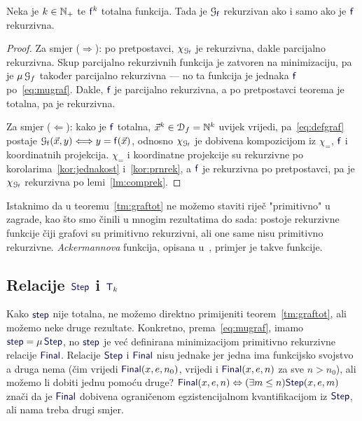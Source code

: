 \begin{teorem}\label{tm:graftot}
Neka je $k\in{\mathbb N}_+$ te $\f{f}^k$ totalna funkcija. Tada je $\graf{\f f}$ rekurzivan ako i samo ako je $\f f$ rekurzivna.
\end{teorem}
\begin{proof}
Za smjer ($\Rightarrow$): po pretpostavci, $\chi_{\graf{\f f}}$ je rekurzivna, dakle parcijalno rekurzivna. Skup parcijalno rekurzivnih funkcija je zatvoren na minimizaciju, pa je $\mu\,\mathcal G_{f}$ također parcijalno rekurzivna --- no ta funkcija je jednaka $\f f$ po~\eqref{eq:mugraf}. Dakle, $\f f$ je parcijalno rekurzivna, a po pretpostavci teorema je totalna, pa je rekurzivna.

Za smjer ($\Leftarrow$): kako je $\f f$ totalna, $\vec x^k\in\mathcal D_{f}={\mathbb N}^k$ uvijek vrijedi, pa~\eqref{eq:defgraf} postaje $\graf{\f f}(\vec x,y)\Longleftrightarrow y=\f f(\vec x)$, odnosno $\chi_{\graf{\f f}}$ je dobivena kompozicijom iz $\chi_=$, $\f f$ i koordinatnih projekcija. $\chi_=$ i koordinatne projekcije su rekurzivne po korolarima~\ref{kor:jednakost} i~\ref{kor:prnrek}, a $\f f$ je rekurzivna po pretpostavci, pa je $\chi_{\graf{\f f}}$ rekurzivna po lemi~\ref{lm:comprek}.
\end{proof}

Istaknimo da u teoremu~\ref{tm:graftot} ne možemo staviti riječ "primitivno" u zagrade, kao što smo činili u mnogim rezultatima do sada: postoje rekurzivne funkcije čiji grafovi su primitivno rekurzivni, ali one same nisu primitivno rekurzivne. \emph{Ackermannova} funkcija, opisana u~\cite[dodatak]{skr:Vuk}, primjer je takve funkcije.

\subsection{Relacije \texorpdfstring{$\f{Step}$ i $\f T_k$}{Step i Tk}}

Kako $\f{step}$ nije totalna, ne možemo direktno primijeniti teorem~\ref{tm:graftot}, ali možemo neke druge rezultate. Konkretno, prema~\eqref{eq:mugraf}, imamo $\f{step}=\mu\,\f{Step}$, no $\f{step}$ je već definirana minimizacijom primitivno rekurzivne relacije $\f{Final}$. Relacije $\f{Step}$ i $\f{Final}$ nisu jednake jer jedna ima funkcijsko svojstvo a druga nema (čim vrijedi $\f{Final}(x,e,n_0)$, vrijedi i $\f{Final}(x,e,n)$ za sve $n>n_0$), ali možemo li dobiti jednu pomoću druge? $\f{Final}(x,e,n)\Leftrightarrow(\exists m\le n)\f{Step}(x,e,m)$ znači da je $\f{Final}$ dobivena ograničenom egzistencijalnom kvantifikacijom iz $\f{Step}$, ali nama treba drugi smjer.

